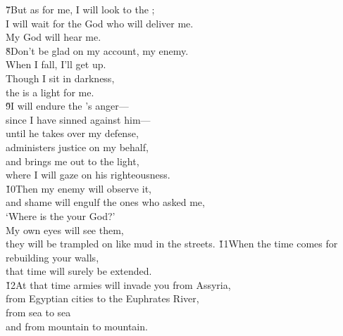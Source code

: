 \begin{poetry}
\poeml \v{7}But as for me, I will look to the ; \\
\poemll    I will wait for the God who will deliver me. \\
\poemlll       My God will hear me. \\
\poeml \v{8}Don't be glad on my account, my enemy. \\
\poemll    When I fall, I'll get up. \\
\poeml Though I sit in darkness, \\
\poemll    the  is a light for me. \\
\poeml \v{9}I will endure the 's anger--- \\
\poemll    since I have sinned against him--- \\
\poeml until he takes over my defense, \\
\poemll    administers justice on my behalf, \\
\poeml and brings me out to the light, \\
\poemll    where I will gaze on his righteousness. \\
\poeml \v{10}Then my enemy will observe it, \\
\poemll    and shame will engulf the ones who asked me, \\
\poemlll       `Where is the  your God?' \\
\poeml My own eyes will see them, \\
\poemll    they will be trampled on like mud in the streets.
\poeml \v{11}When the time comes for rebuilding your walls, \\
\poemll    that time will surely be extended. \\
\poeml \v{12}At that time armies will invade you from Assyria, \\
\poemll    from Egyptian cities to the Euphrates River, \\
\poeml from sea to sea \\
\poemll    and from mountain to mountain. \\

\end{poetry}
